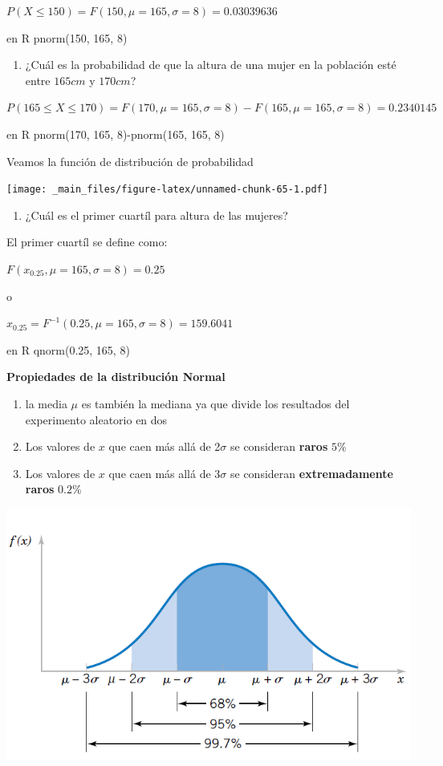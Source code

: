 \documentclass[
]{book}
\providecommand{\tightlist}{%
  \setlength{\itemsep}{0pt}\setlength{\parskip}{0pt}}
\begin{document}
\(P(X\le 150)=F(150, \mu=165, \sigma=8)=0.03039636\)

en R pnorm(150, 165, 8)

\begin{enumerate}
\def\labelenumi{\arabic{enumi})}
\setcounter{enumi}{1}
\tightlist
\item
  ¿Cuál es la probabilidad de que la altura de una mujer en la población esté entre \(165cm\) y \(170cm\)?
\end{enumerate}

\(P(165 \le X \le 170)=F(170, \mu=165, \sigma=8)-F(165, \mu=165, \sigma=8)=0.2340145\)

en R pnorm(170, 165, 8)-pnorm(165, 165, 8)

Veamos la función de distribución de probabilidad

\texttt{[image: \_main\_files/figure-latex/unnamed-chunk-65-1.pdf]}

\begin{enumerate}
\def\labelenumi{\arabic{enumi})}
\setcounter{enumi}{2}
\tightlist
\item
  ¿Cuál es el primer cuartíl para altura de las mujeres?
\end{enumerate}

El primer cuartíl se define como:

\(F(x_{0.25}, \mu=165, \sigma=8)=0.25\)

o

\(x_{0.25}=F^{-1}(0.25, \mu=165, \sigma=8)=159.6041\)

en R qnorm(0.25, 165, 8)

\textbf{Propiedades de la distribución Normal}

\begin{enumerate}
\def\labelenumi{\arabic{enumi})}
\item
  la media \(\mu\) es también la mediana ya que divide los resultados del experimento aleatorio en dos
\item
  Los valores de \(x\) que caen más allá de 2\(\sigma\) se consideran \textbf{raros} \(5\%\)
\item
  Los valores de \(x\) que caen más allá de 3\(\sigma\) se consideran \textbf{extremadamente raros} \(0.2\%\)
\end{enumerate}

\includegraphics{./figures/probs.png}
\end{document}
